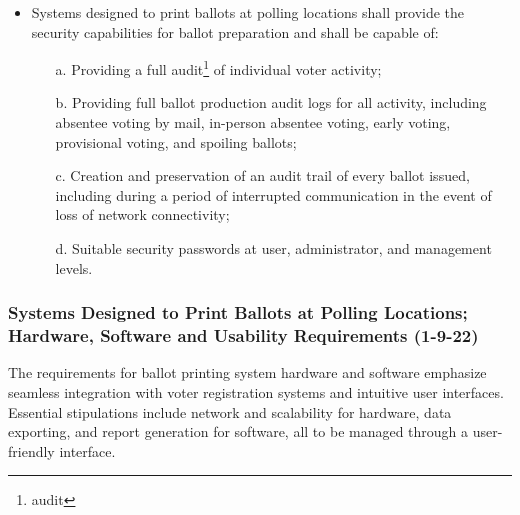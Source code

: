 \documentclass{article}
\begin{document}
\begin{itemize}
    \item Systems designed to print ballots at polling locations shall provide the security capabilities for ballot preparation and shall be capable of:
    \begin{itemize}
        \item[a.] Providing a full \gls{audit}\footnote{\glsdesc{audit}} of individual voter activity;
        \item[b.] Providing full ballot production audit logs for all activity, including absentee voting by mail, in-person absentee voting, early voting, provisional voting, and spoiling ballots;
        \item[c.] Creation and preservation of an audit trail of every ballot issued, including during a period of interrupted communication in the event of loss of network connectivity;
        \item[d.] Suitable security passwords at user, administrator, and management levels.
    \end{itemize}
\end{itemize}

\subsubsection{Systems Designed to Print Ballots at Polling Locations; Hardware, Software and Usability Requirements (1-9-22)}
The requirements for ballot printing system hardware and software emphasize seamless integration with voter registration systems and intuitive user interfaces. Essential stipulations include network and scalability for hardware, data exporting, and report generation for software, all to be managed through a user-friendly interface.
\end{document}
